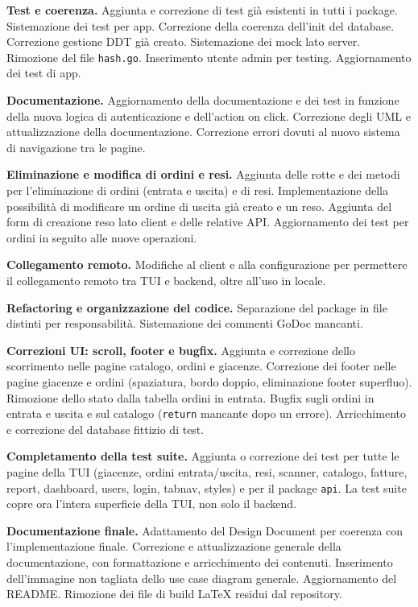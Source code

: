 \documentclass[a4paper,12pt]{article}
\begin{document}
\textbf{Test e coerenza.}
Aggiunta e correzione di test gi\`{a} esistenti in tutti i package. Sistemazione dei test per app. Correzione della coerenza dell'init del database. Correzione gestione DDT gi\`{a} creato. Sistemazione dei mock lato server. Rimozione del file \texttt{hash.go}. Inserimento utente admin per testing. Aggiornamento dei test di app.

\textbf{Documentazione.}
Aggiornamento della documentazione e dei test in funzione della nuova logica di autenticazione e dell'action on click. Correzione degli UML e attualizzazione della documentazione. Correzione errori dovuti al nuovo sistema di navigazione tra le pagine.

\textbf{Eliminazione e modifica di ordini e resi.}
Aggiunta delle rotte e dei metodi per l'eliminazione di ordini (entrata e uscita) e di resi. Implementazione della possibilit\`{a} di modificare un ordine di uscita gi\`{a} creato e un reso. Aggiunta del form di creazione reso lato client e delle relative API. Aggiornamento dei test per ordini in seguito alle nuove operazioni.

\textbf{Collegamento remoto.}
Modifiche al client e alla configurazione per permettere il collegamento remoto tra TUI e backend, oltre all'uso in locale.

\textbf{Refactoring e organizzazione del codice.}
Separazione del package in file distinti per responsabilit\`{a}. Sistemazione dei commenti GoDoc mancanti.

\textbf{Correzioni UI: scroll, footer e bugfix.}
Aggiunta e correzione dello scorrimento nelle pagine catalogo, ordini e giacenze. Correzione dei footer nelle pagine giacenze e ordini (spaziatura, bordo doppio, eliminazione footer superfluo). Rimozione dello stato dalla tabella ordini in entrata. Bugfix sugli ordini in entrata e uscita e sul catalogo (\texttt{return} mancante dopo un errore). Arricchimento e correzione del database fittizio di test.

\textbf{Completamento della test suite.}
Aggiunta o correzione dei test per tutte le pagine della TUI (giacenze, ordini entrata/uscita, resi, scanner, catalogo, fatture, report, dashboard, users, login, tabnav, styles) e per il package \texttt{api}. La test suite copre ora l'intera superficie della TUI, non solo il backend.

\textbf{Documentazione finale.}
Adattamento del Design Document per coerenza con l'implementazione finale. Correzione e attualizzazione generale della documentazione, con formattazione e arricchimento dei contenuti. Inserimento dell'immagine non tagliata dello use case diagram generale. Aggiornamento del README. Rimozione dei file di build LaTeX residui dal repository.
\end{document}
